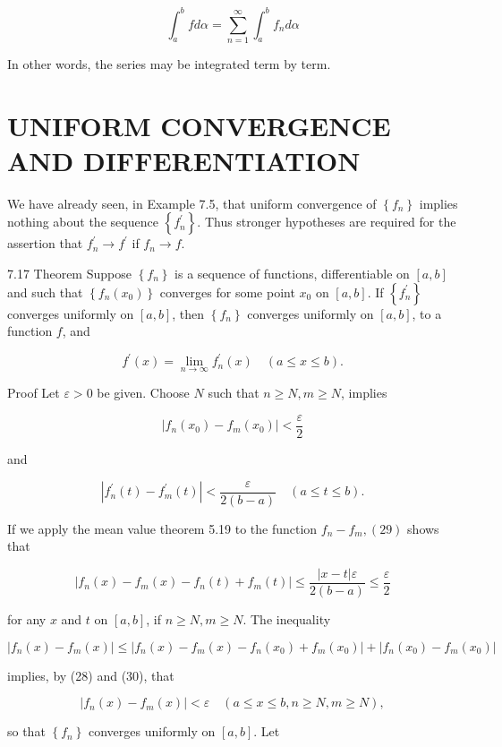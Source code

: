 \documentclass[10pt]{article}
\begin{document}
$$
\int_{a}^{b} f d \alpha=\sum_{n=1}^{\infty} \int_{a}^{b} f_{n} d \alpha
$$

In other words, the series may be integrated term by term.

\section{UNIFORM CONVERGENCE AND DIFFERENTIATION}
We have already seen, in Example 7.5, that uniform convergence of $\left\{f_{n}\right\}$ implies nothing about the sequence $\left\{f_{n}^{\prime}\right\}$. Thus stronger hypotheses are required for the assertion that $f_{n}^{\prime} \rightarrow f^{\prime}$ if $f_{n} \rightarrow f$.

7.17 Theorem Suppose $\left\{f_{n}\right\}$ is a sequence of functions, differentiable on $[a, b]$ and such that $\left\{f_{n}\left(x_{0}\right)\right\}$ converges for some point $x_{0}$ on $[a, b]$. If $\left\{f_{n}^{\prime}\right\}$ converges uniformly on $[a, b]$, then $\left\{f_{n}\right\}$ converges uniformly on $[a, b]$, to a function $f$, and

$$
f^{\prime}(x)=\lim _{n \rightarrow \infty} f_{n}^{\prime}(x) \quad(a \leq x \leq b) .
$$

Proof Let $\varepsilon>0$ be given. Choose $N$ such that $n \geq N, m \geq N$, implies

$$
\left|f_{n}\left(x_{0}\right)-f_{m}\left(x_{0}\right)\right|<\frac{\varepsilon}{2}
$$

and

$$
\left|f_{n}^{\prime}(t)-f_{m}^{\prime}(t)\right|<\frac{\varepsilon}{2(b-a)} \quad(a \leq t \leq b) .
$$

If we apply the mean value theorem 5.19 to the function $f_{n}-f_{m},(29)$ shows that

$$
\left|f_{n}(x)-f_{m}(x)-f_{n}(t)+f_{m}(t)\right| \leq \frac{|x-t| \varepsilon}{2(b-a)} \leq \frac{\varepsilon}{2}
$$

for any $x$ and $t$ on $[a, b]$, if $n \geq N, m \geq N$. The inequality

$$
\left|f_{n}(x)-f_{m}(x)\right| \leq\left|f_{n}(x)-f_{m}(x)-f_{n}\left(x_{0}\right)+f_{m}\left(x_{0}\right)\right|+\left|f_{n}\left(x_{0}\right)-f_{m}\left(x_{0}\right)\right|
$$

implies, by (28) and (30), that

$$
\left|f_{n}(x)-f_{m}(x)\right|<\varepsilon \quad(a \leq x \leq b, n \geq N, m \geq N),
$$

so that $\left\{f_{n}\right\}$ converges uniformly on $[a, b]$. Let
\end{document}

